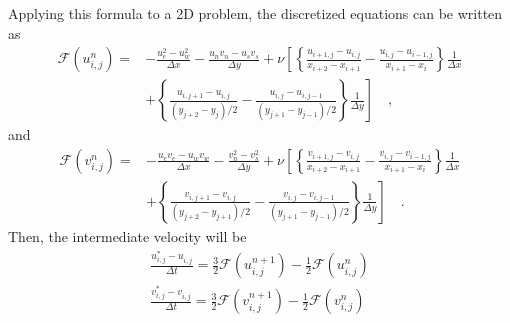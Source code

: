 \documentclass[12pt,a4paper,fleqn]{article}
\begin{document}
    Applying this formula to a 2D problem, the discretized equations can be written as
    \begin{align}
    \mathcal{F}(u_{i,j}^n) = {}& - \frac{u_e^2 - u_w^2}{\Delta x} - \frac{u_n v_n - u_s v_s}{\Delta y} + \nu\left[
    \left\{
    \frac{u_{i+1,j}-u_{i,j}}{x_{i+2}-x_{i+1}}
    - \frac{u_{i,j}-u_{i-1,j}}{x_{i+1}-x_i}
    \right\}
    \frac{1}{\Delta x}
    \right.\nonumber\\
    & \left. + \left\{
    \frac{u_{i,j+1}-u_{i,j}}{(y_{j+2}-y_j)/2}
    - \frac{u_{i,j}-u_{i,j-1}}{(y_{j+1}-y_{j-1})/2}
    \right\}
    \frac{1}{\Delta y}
    \right] \quad ,
    \label{eq:Fu}
    \end{align}
    and
    \begin{align}
    \mathcal{F}(v_{i,j}^n) = {}& - \frac{u_e v_e - u_w v_w}{\Delta x} - \frac{v_n^2 - v_s^2}{\Delta y} + \nu\left[
    \left\{
    \frac{v_{i+1,j}-v_{i,j}}{x_{i+2}-x_{i+1}}
    - \frac{v_{i,j}-v_{i-1,j}}{x_{i+1}-x_i}
    \right\}
    \frac{1}{\Delta x}
    \right.\nonumber\\
    & \left. + \left\{
    \frac{v_{i,j+1}-v_{i,j}}{(y_{j+2}-y_{j+1})/2}
    - \frac{v_{i,j}-v_{i,j-1}}{(y_{j+1}-y_{j-1})/2}
    \right\}
    \frac{1}{\Delta y}
    \right] \quad .
    \label{eq:Fv}
    \end{align}
    Then, the intermediate velocity will be
    \begin{eqnarray}
    \frac{u^*_{i,j} - u^{}_{i,j}}{\Delta t} = \frac{3}{2}\mathcal{F}(u_{i,j}^{n+1}) - \frac{1}{2}\mathcal{F}(u_{i,j}^{n}) \\
    \frac{v^*_{i,j} - v^{}_{i,j}}{\Delta t} = \frac{3}{2}\mathcal{F}(v_{i,j}^{n+1}) - \frac{1}{2}\mathcal{F}(v_{i,j}^{n})
    \end{eqnarray}
\end{document}

